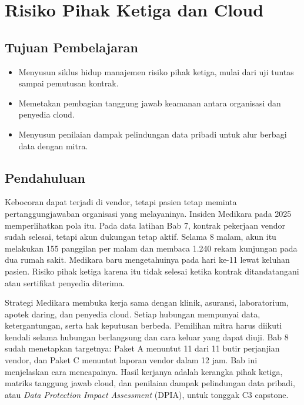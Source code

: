 \chapter{Risiko Pihak Ketiga dan Cloud}

\section*{Tujuan Pembelajaran}
\begin{itemize}
  \item Menyusun siklus hidup manajemen risiko pihak ketiga, mulai dari uji tuntas sampai
  pemutusan kontrak.
  \item Memetakan pembagian tanggung jawab keamanan antara organisasi dan penyedia cloud.
  \item Menyusun penilaian dampak pelindungan data pribadi untuk alur berbagi data dengan mitra.
\end{itemize}

\section{Pendahuluan}

Kebocoran dapat terjadi di vendor, tetapi pasien tetap meminta pertanggungjawaban organisasi
yang melayaninya. Insiden Medikara pada 2025 memperlihatkan pola itu. Pada data latihan Bab 7,
kontrak pekerjaan vendor sudah selesai, tetapi akun dukungan tetap aktif. Selama 8 malam, akun
itu melakukan 155 panggilan per malam dan membaca 1.240 rekam kunjungan pada dua rumah sakit.
Medikara baru mengetahuinya pada hari ke-11 lewat keluhan pasien. Risiko pihak ketiga karena itu
tidak selesai ketika kontrak ditandatangani atau sertifikat penyedia diterima.

Strategi Medikara membuka kerja sama dengan klinik, asuransi, laboratorium, apotek daring, dan
penyedia cloud. Setiap hubungan mempunyai data, ketergantungan, serta hak keputusan berbeda.
Pemilihan mitra harus diikuti kendali selama hubungan berlangsung dan cara keluar yang dapat
diuji. Bab 8 sudah menetapkan targetnya: Paket A menuntut 11 dari 11 butir perjanjian vendor,
dan Paket C menuntut laporan vendor dalam 12 jam. Bab ini menjelaskan cara mencapainya. Hasil
kerjanya adalah kerangka pihak ketiga, matriks tanggung jawab cloud, dan penilaian dampak
pelindungan data pribadi, atau \textit{Data Protection Impact Assessment} (DPIA), untuk tonggak
C3 capstone.

